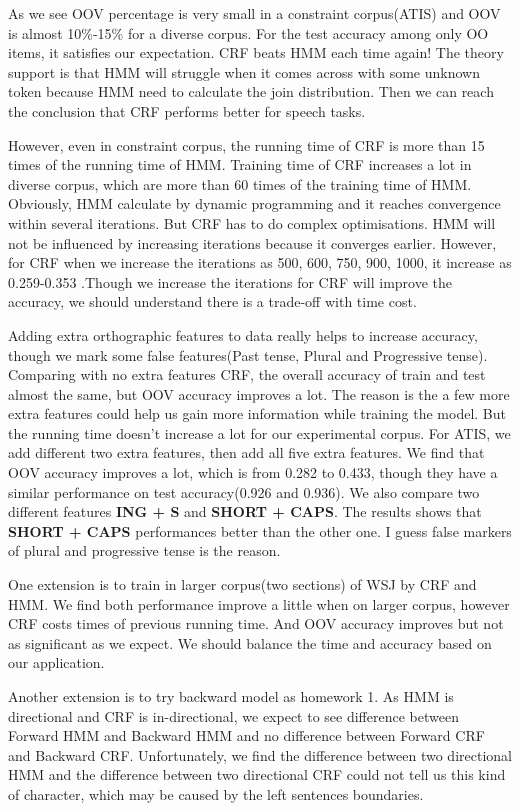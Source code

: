 \documentclass[journal, a4paper]{IEEEtran}
\begin{document}
As we see OOV percentage is very small in a constraint corpus(ATIS) and OOV is almost 10\%-15\% for a diverse corpus. For the test accuracy among only OO items, it satisfies our expectation. CRF beats HMM each time again! The theory support is that HMM will struggle when it comes across with some unknown token because HMM need to calculate the join distribution. Then we can reach the conclusion that CRF performs better for speech tasks.

However, even in constraint corpus, the running time of CRF is more than 15 times of the running time of HMM. Training time of CRF increases a lot in diverse corpus, which are more than 60 times of the training time of HMM. Obviously, HMM calculate by dynamic programming and it reaches convergence within several iterations. But CRF has to do complex optimisations. HMM will not be influenced by increasing iterations because it converges earlier. However, for CRF when we increase the iterations as 500, 600, 750, 900, 1000, it increase as 0.259-0.353 .Though we increase the iterations for CRF will improve the accuracy, we should understand there is a trade-off with time cost.

Adding extra orthographic features to data really helps to increase accuracy, though we mark some false features(Past tense, Plural and Progressive tense). Comparing with no extra features CRF, the overall accuracy of train and test almost the same, but OOV accuracy improves a lot. The reason is the a few more extra features could help us gain more information while training the model. But the running time doesn't increase a lot for our experimental corpus. For ATIS, we add different two extra features, then add all five extra features. We find that OOV accuracy improves a lot, which is from 0.282 to 0.433, though they have a similar performance on test accuracy(0.926 and 0.936). We also compare two different features {\bf ING + S} and {\bf SHORT + CAPS}. The results shows that {\bf SHORT + CAPS} performances better than the other one. I guess false markers of plural and progressive tense is the reason.

One extension is to train in larger corpus(two sections) of WSJ by CRF and HMM. We find both performance improve a little when on larger corpus, however CRF costs times of previous running time. And OOV accuracy improves but not as significant as we expect. We should balance the time and accuracy based on our application.

Another extension is to try backward model as homework 1. As HMM is directional and CRF is in-directional, we expect to see difference between Forward HMM and Backward HMM and no difference between Forward CRF and Backward CRF. Unfortunately, we find the difference between two directional HMM and the difference between two directional CRF could not tell us this kind of character, which may be caused by the left sentences boundaries. 
\end{document}

